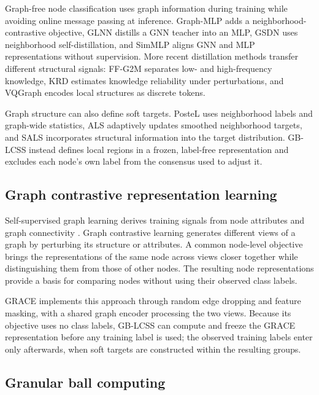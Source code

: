 \documentclass[times,review,10pt]{elsarticle}
\theoremstyle{definition}
\theoremstyle{plain}
\begin{document}
Graph-free node classification uses graph information during training while avoiding online message passing at inference. Graph-MLP \cite{ref3} adds a neighborhood-contrastive objective, GLNN \cite{ref4} distills a GNN teacher into an MLP, GSDN \cite{ref40} uses neighborhood self-distillation, and SimMLP \cite{ref41} aligns GNN and MLP representations without supervision. More recent distillation methods transfer different structural signals: FF-G2M \cite{ref45} separates low- and high-frequency knowledge, KRD \cite{ref46} estimates knowledge reliability under perturbations, and VQGraph \cite{ref47} encodes local structures as discrete tokens.

Graph structure can also define soft targets. PosteL \cite{ref54} uses neighborhood labels and graph-wide statistics, ALS \cite{ref55} adaptively updates smoothed neighborhood targets, and SALS \cite{ref56} incorporates structural information into the target distribution. GB-LCSS instead defines local regions in a frozen, label-free representation and excludes each node's own label from the consensus used to adjust it.

\subsection{Graph contrastive representation learning}\label{sec:2.4}

Self-supervised graph learning derives training signals from node attributes and graph connectivity \cite{ref57}. Graph contrastive learning generates different views of a graph by perturbing its structure or attributes. A common node-level objective brings the representations of the same node across views closer together while distinguishing them from those of other nodes. The resulting node representations provide a basis for comparing nodes without using their observed class labels.

GRACE \cite{ref12} implements this approach through random edge dropping and feature masking, with a shared graph encoder processing the two views. Because its objective uses no class labels, GB-LCSS can compute and freeze the GRACE representation before any training label is used; the observed training labels enter only afterwards, when soft targets are constructed within the resulting groups.

\subsection{Granular ball computing}\label{sec:2.5}
\end{document}

